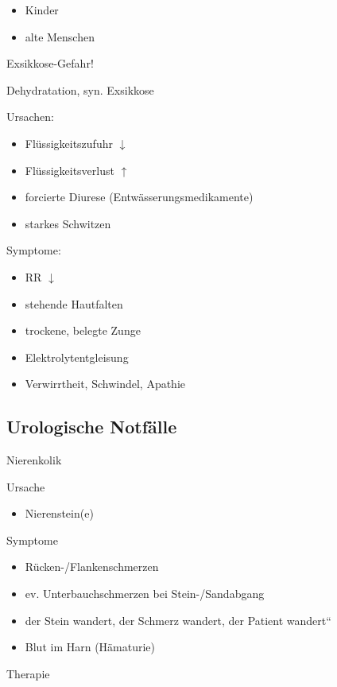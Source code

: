 \documentclass{article}
\begin{document}
\begin{itemize}
\item Kinder

\item alte Menschen

\end{itemize}
Exsikkose-Gefahr!

Dehydratation, syn. Exsikkose

Ursachen:

\begin{itemize}
\item Fl\"ussigkeitszufuhr ${\downarrow}$

\item Fl\"ussigkeitsverlust ${\uparrow}$

\item forcierte Diurese  (Entw\"asserungsmedikamente)

\item starkes Schwitzen

\end{itemize}
Symptome:

\begin{itemize}
\item RR ${\downarrow}$

\item stehende Hautfalten

\item trockene, belegte Zunge

\item Elektrolytentgleisung

\item Verwirrtheit, Schwindel, Apathie

\end{itemize}
\subsection{Urologische Notf\"alle}
Nierenkolik

Ursache

\begin{itemize}
\item Nierenstein(e)

\end{itemize}
Symptome

\begin{itemize}
\item R\"ucken-/Flankenschmerzen

\item ev. Unterbauchschmerzen bei  Stein-/Sandabgang

\item {\quotedblbase}der Stein wandert, der Schmerz wandert, der Patient
wandert{\textquotedblleft}

\item Blut im Harn (H\"amaturie)

\end{itemize}
Therapie
\end{document}
